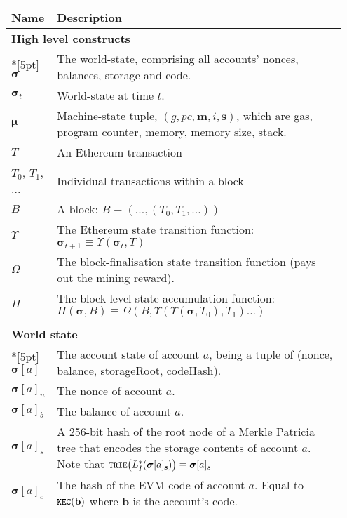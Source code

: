 \documentclass[9pt,oneside]{amsart}
\begin{document}
\begin{longtable}{p{0.10\linewidth}p{0.85\linewidth}}
\toprule
Name & Description \\
\midrule
\endhead
\multicolumn{2}{l}{\textbf{High level constructs}} \\*[5pt]
$\boldsymbol{\sigma}$ & The world-state, comprising all accounts' nonces, balances, storage and code. \\
$\boldsymbol{\sigma}_t$ & World-state at time $t$. \\
$\boldsymbol{\mu}$ & Machine-state tuple, $(g, pc, \mathbf{m}, i, \mathbf{s})$, which are gas, program counter, memory, memory size, stack. \\
$T$ & An Ethereum transaction \\
$T_0$, $T_1$, ... & Individual transactions within a block \\
$B$ & A block: $B \equiv (..., (T_0, T_1, ...) )$ \\
$\Upsilon$ & The Ethereum state transition function: $\boldsymbol{\sigma}_{t+1} \equiv \Upsilon(\boldsymbol{\sigma}_t, T)$ \\
$\Omega$ & The block-finalisation state transition function (pays out the mining reward). \\
$\Pi$ & The block-level state-accumulation function: $\Pi(\boldsymbol{\sigma}, B) \equiv \Omega(B, \Upsilon(\Upsilon(\boldsymbol{\sigma}, T_0), T_1) ...)$ \\

\vspace{5pt} \\
\midrule
\multicolumn{2}{l}{\textbf{World state}} \\*[5pt]
$\boldsymbol{\sigma}[a]$ & The account state of account $a$, being a tuple of (nonce, balance, storageRoot, codeHash). \\
$\boldsymbol{\sigma}[a]_n$ & The nonce of account $a$. \\
$\boldsymbol{\sigma}[a]_b$ & The balance of account $a$. \\
$\boldsymbol{\sigma}[a]_s$ & A 256-bit hash of the root node of a Merkle Patricia tree that encodes the storage contents of account $a$. Note that $\texttt{\small TRIE}\big(L_I^*(\boldsymbol{\sigma}[a]_\mathbf{s})\big) \equiv \boldsymbol{\sigma}[a]_s$ \\
$\boldsymbol{\sigma}[a]_c$ & The hash of the EVM code of account $a$. Equal to $\texttt{\small KEC}(\mathbf{b})$ where $\mathbf{b}$ is the account's code.\\


\end{longtable}
\end{document}
